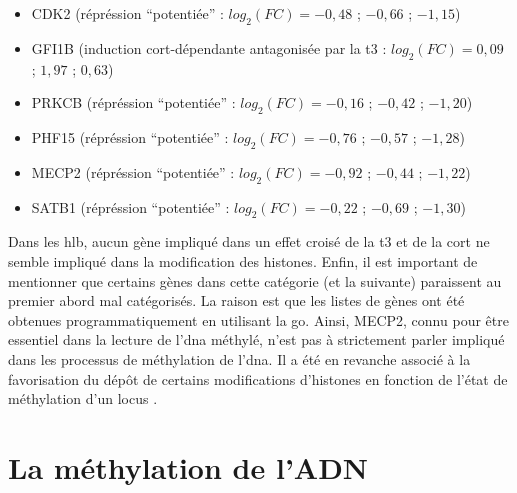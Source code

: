 \documentclass[../main.tex]{subfiles}
\begin{document}
	\begin{itemize}
	\item CDK2 (répréssion ``potentiée'' : $log_2(FC)=-0,48$ ; $-0,66$ ; $-1,15$)
	\item GFI1B (induction \gls{cort}-dépendante antagonisée par la \gls{t3} : $log_2(FC)=0,09$ ; $1,97$ ; $0,63$)
	\item PRKCB (répréssion ``potentiée'' : $log_2(FC)=-0,16$ ; $-0,42$ ; $-1,20$)
	\item PHF15 (répréssion ``potentiée'' : $log_2(FC)=-0,76$ ; $-0,57$ ; $-1,28$)
	\item MECP2 (répréssion ``potentiée'' : $log_2(FC)=-0,92$ ; $-0,44$ ; $-1,22$)
	\item SATB1 (répréssion ``potentiée'' : $log_2(FC)=-0,22$ ; $-0,69$ ; $-1,30$)
	\end{itemize}
	Dans les \gls{hlb}, aucun gène impliqué dans un effet croisé de la \gls{t3} et de la \gls{cort} ne semble impliqué dans la modification des histones.
	Enfin, il est important de mentionner que certains gènes dans cette catégorie (et la suivante) paraissent au premier abord mal catégorisés.
	La raison est que les listes de gènes ont été obtenues programmatiquement en utilisant la \gls{go}.
	Ainsi, MECP2, connu pour être essentiel dans la lecture de l'\gls{dna} méthylé, n'est pas à strictement parler impliqué dans les processus de méthylation de l'\gls{dna}.
	Il a été en revanche associé à la favorisation du dépôt de certains modifications d'histones en fonction de l'état de méthylation d'un locus \citep{Fuks2003}.

	


\section{La méthylation de l'ADN}
\end{document}

